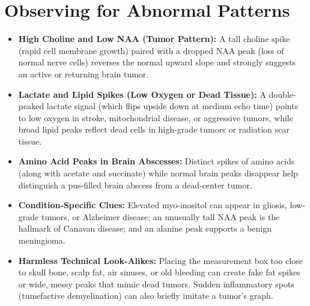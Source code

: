 \section{Observing for Abnormal Patterns}
\begin{itemize}
\item \textbf{High Choline and Low NAA (Tumor Pattern):} A tall choline spike (rapid cell membrane growth) paired with a dropped NAA peak (loss of normal nerve cells) reverses the normal upward slope and strongly suggests an active or returning brain tumor.
\item \textbf{Lactate and Lipid Spikes (Low Oxygen or Dead Tissue):} A double-peaked lactate signal (which flips upside down at medium echo time) points to low oxygen in stroke, mitochondrial disease, or aggressive tumors, while broad lipid peaks reflect dead cells in high-grade tumors or radiation scar tissue.
\item \textbf{Amino Acid Peaks in Brain Abscesses:} Distinct spikes of amino acids (along with acetate and succinate) while normal brain peaks disappear help distinguish a pus-filled brain abscess from a dead-center tumor.
\item \textbf{Condition-Specific Clues:} Elevated myo-inositol can appear in gliosis, low-grade tumors, or Alzheimer disease; an unusually tall NAA peak is the hallmark of Canavan disease; and an alanine peak supports a benign meningioma.
\item \textbf{Harmless Technical Look-Alikes:} Placing the measurement box too close to skull bone, scalp fat, air sinuses, or old bleeding can create fake fat spikes or wide, messy peaks that mimic dead tumors. Sudden inflammatory spots (tumefactive demyelination) can also briefly imitate a tumor's graph.
\end{itemize}

